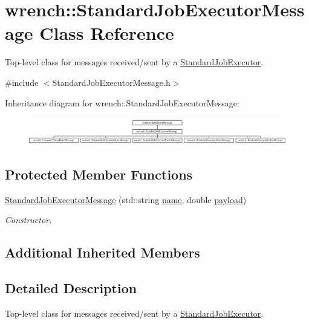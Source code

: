\hypertarget{classwrench_1_1_standard_job_executor_message}{}\section{wrench\+:\+:Standard\+Job\+Executor\+Message Class Reference}
\label{classwrench_1_1_standard_job_executor_message}


Top-\/level class for messages received/sent by a \hyperlink{classwrench_1_1_standard_job_executor}{Standard\+Job\+Executor}.  




{\ttfamily \#include $<$Standard\+Job\+Executor\+Message.\+h$>$}

Inheritance diagram for wrench\+:\+:Standard\+Job\+Executor\+Message\+:\begin{figure}[H]
\begin{center}
\leavevmode
\includegraphics[height=1.217391cm]{classwrench_1_1_standard_job_executor_message}
\end{center}
\end{figure}
\subsection*{Protected Member Functions}
\begin{DoxyCompactItemize}
\item 
\hyperlink{classwrench_1_1_standard_job_executor_message_aa169f57b74f3d18a4a155406deeb5f0b}{Standard\+Job\+Executor\+Message} (std\+::string \hyperlink{classwrench_1_1_simulation_message_ab224f6dd8ec5ee2e7f65bfcdf2b8a86b}{name}, double \hyperlink{classwrench_1_1_simulation_message_a914f2732713f7c02898e66f05a7cb8a1}{payload})
\begin{DoxyCompactList}\small\item\em Constructor. \end{DoxyCompactList}\end{DoxyCompactItemize}
\subsection*{Additional Inherited Members}


\subsection{Detailed Description}
Top-\/level class for messages received/sent by a \hyperlink{classwrench_1_1_standard_job_executor}{Standard\+Job\+Executor}. 

